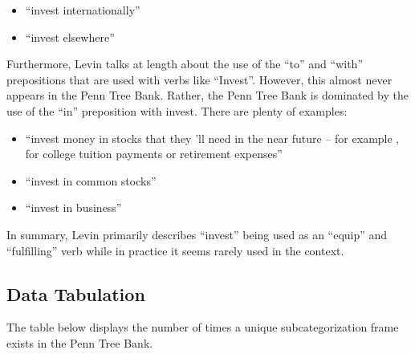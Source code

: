 \documentclass[10pt]{article}
\begin{document}
\begin{itemize}
\item ``invest internationally''
\item ``invest elsewhere''
\end{itemize}

Furthermore, Levin talks at length about the use of the ``to'' and ``with'' prepositions that are used with verbs like ``Invest''. However, this almost never appears in the Penn Tree Bank. Rather, the Penn Tree Bank is dominated by the use of the ``in'' preposition with invest. There are plenty of examples:

\begin{itemize}
\item ``invest money in stocks that they 'll need in the near future -- for example , for college tuition payments or retirement expenses''
\item ``invest in common stocks''
\item ``invest in business''
\end{itemize}

In summary, Levin primarily describes ``invest'' being used as an ``equip'' and ``fulfilling'' verb while in practice it seems rarely used in the context.

\subsection*{Data Tabulation}

The table below displays the number of times a unique subcategorization frame exists in the Penn Tree Bank. 
\end{document}
